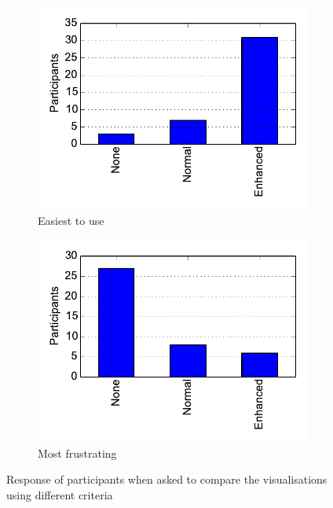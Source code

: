 \begin{figure}[ht]
\centering
\begin{subfigure}{.5\textwidth}
  \centering
  \includegraphics[width=\textwidth]{figs/easiest.pdf}
  \caption{Easiest to use}
  \label{fig:easiest}
\end{subfigure}%
\begin{subfigure}{.5\textwidth}
  \centering
  \includegraphics[width=\linewidth]{figs/frustrating.pdf}
  \caption{Most frustrating}
  \label{fig:frustrating}
\end{subfigure}
\caption{Response of participants when asked to compare the visualisations
  using different criteria}
\label{fig:compare}
\end{figure}


